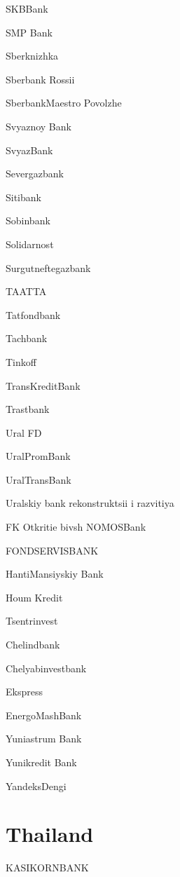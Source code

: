 \documentclass[a4paper,10pt,english]{sphinxmanual}
\begin{document}
\sphinxAtStartPar
SKBBank

\sphinxAtStartPar
SMP Bank

\sphinxAtStartPar
Sberknizhka

\sphinxAtStartPar
Sberbank Rossii

\sphinxAtStartPar
SberbankMaestro Povolzhe

\sphinxAtStartPar
Svyaznoy Bank

\sphinxAtStartPar
SvyazBank

\sphinxAtStartPar
Severgazbank

\sphinxAtStartPar
Sitibank

\sphinxAtStartPar
Sobinbank

\sphinxAtStartPar
Solidarnost

\sphinxAtStartPar
Surgutneftegazbank

\sphinxAtStartPar
TAATTA

\sphinxAtStartPar
Tatfondbank

\sphinxAtStartPar
Tachbank

\sphinxAtStartPar
Tinkoff

\sphinxAtStartPar
TransKreditBank

\sphinxAtStartPar
Trastbank

\sphinxAtStartPar
Ural FD

\sphinxAtStartPar
UralPromBank

\sphinxAtStartPar
UralTransBank

\sphinxAtStartPar
Uralskiy bank rekonstruktsii i razvitiya

\sphinxAtStartPar
FK Otkritie bivsh NOMOSBank

\sphinxAtStartPar
FONDSERVISBANK

\sphinxAtStartPar
HantiMansiyskiy Bank

\sphinxAtStartPar
Houm Kredit

\sphinxAtStartPar
Tsentrinvest

\sphinxAtStartPar
Chelindbank

\sphinxAtStartPar
Chelyabinvestbank

\sphinxAtStartPar
Ekspress

\sphinxAtStartPar
EnergoMashBank

\sphinxAtStartPar
Yuniastrum Bank

\sphinxAtStartPar
Yunikredit Bank

\sphinxAtStartPar
YandeksDengi


\section{Thailand}
\label{\detokenize{banks:thailand}}
\sphinxAtStartPar
KASIKORNBANK
\end{document}
